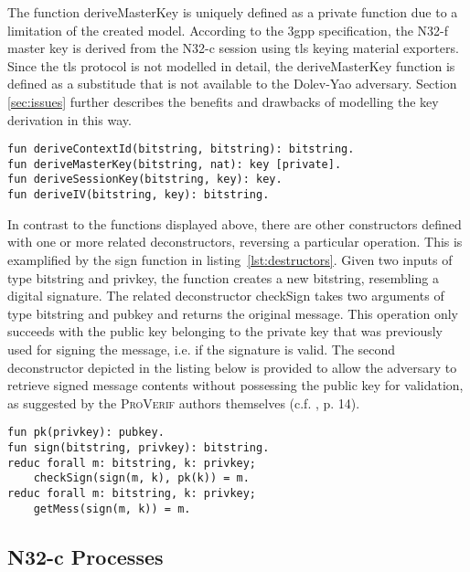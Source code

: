 The function {\sffamily deriveMasterKey} is uniquely defined as a private function due to a limitation of the created model.
According to the \gls{3gpp} specification, the N32-f master key is derived from the N32-c session using \gls{tls} keying material exporters.
Since the \gls{tls} protocol is not modelled in detail, the {\sffamily deriveMasterKey} function is defined as a substitude that is not available to the Dolev-Yao adversary.
Section \ref{sec:issues} further describes the benefits and drawbacks of modelling the key derivation in this way.

\begin{lstlisting}[caption={Definition of custom one-way functions},label={lst:functions},firstnumber=96]
fun deriveContextId(bitstring, bitstring): bitstring.
fun deriveMasterKey(bitstring, nat): key [private].
fun deriveSessionKey(bitstring, key): key.
fun deriveIV(bitstring, key): bitstring.
\end{lstlisting}

In contrast to the functions displayed above, there are other constructors defined with one or more related deconstructors, reversing a particular operation.
This is examplified by the {\sffamily sign} function in listing~\ref{lst:destructors}.
Given two inputs of type {\sffamily bitstring} and {\sffamily privkey}, the function creates a new {\sffamily bitstring}, resembling a digital signature.
The related deconstructor {\sffamily checkSign} takes two arguments of type {\sffamily bitstring} and {\sffamily pubkey} and returns the original message.
This operation only succeeds with the public key belonging to the private key that was previously used for signing the message, i.e. if the signature is valid.
The second deconstructor depicted in the listing below is provided to allow the adversary to retrieve signed message contents without possessing the public key for validation, as suggested by the \textsc{ProVerif} authors themselves (c.f. \cite{blanchet2020proverif}, p. 14).

\begin{lstlisting}[caption={Definition of custom constructors and destructors},label={lst:destructors},firstnumber=112]
fun pk(privkey): pubkey.
fun sign(bitstring, privkey): bitstring.
reduc forall m: bitstring, k: privkey;
    checkSign(sign(m, k), pk(k)) = m.
reduc forall m: bitstring, k: privkey;
    getMess(sign(m, k)) = m.
\end{lstlisting}

\subsection{N32-c Processes}

